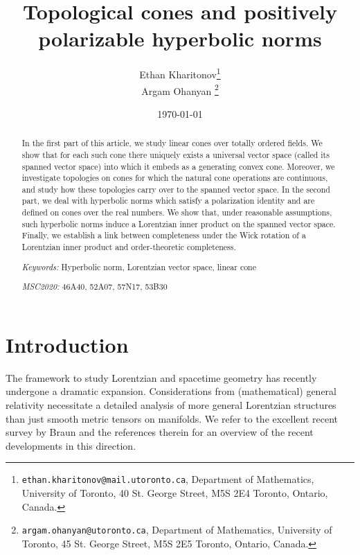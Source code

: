 \documentclass[a4paper,11pt]{article}
\title{Topological cones and positively polarizable hyperbolic norms}
\author{Ethan Kharitonov\thanks{{\tt ethan.kharitonov@mail.utoronto.ca}, Department of Mathematics, University of Toronto, 40 St. George Street, M5S 2E4 Toronto, Ontario, Canada.}\\Argam Ohanyan \thanks{{\tt argam.ohanyan@utoronto.ca}, Department of Mathematics, University of Toronto, 45 St. George Street, M5S 2E5 Toronto, Ontario, Canada.}}
\numberwithin{equation}{section}
\theoremstyle{definition}
\theoremstyle{plain}
\begin{document}
\date{\today}


\maketitle

\begin{abstract}

In the first part of this article, we study linear cones over totally ordered fields. We show that for each such cone there uniquely exists a universal vector space (called its spanned vector space) into which it embeds as a generating convex cone. Moreover, we investigate topologies on cones for which the natural cone operations are continuous, and study how these topologies carry over to the spanned vector space. In the second part, we deal with hyperbolic norms which satisfy a polarization identity and are defined on cones over the real numbers. We show that, under reasonable assumptions, such hyperbolic norms induce a Lorentzian inner product on the spanned vector space. Finally, we establish a link between completeness under the Wick rotation of a Lorentzian inner product and order-theoretic completeness.

\vspace{1em}

\noindent
\emph{Keywords:} Hyperbolic norm, Lorentzian vector space, linear cone
\medskip

\noindent
\emph{MSC2020:} 
46A40, 52A07, 57N17, 53B30
\end{abstract}
\tableofcontents

\section{Introduction}

The framework to study Lorentzian and spacetime geometry has recently undergone a dramatic expansion. Considerations from (mathematical) general relativity necessitate a detailed analysis of more general Lorentzian structures than just smooth metric tensors on manifolds. We refer to the excellent recent survey by Braun \cite{braun2025new} and the references therein for an overview of the recent developments in this direction.
\end{document}
